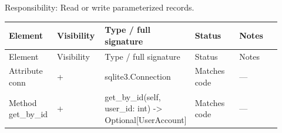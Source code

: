 Responsibility: Read or write parameterized records.

\begin{longtable}{>{\raggedright\arraybackslash}p{0.1840\linewidth}>{\raggedright\arraybackslash}p{0.1840\linewidth}>{\raggedright\arraybackslash}p{0.1840\linewidth}>{\raggedright\arraybackslash}p{0.1840\linewidth}>{\raggedright\arraybackslash}p{0.1840\linewidth}}
Element & Visibility & Type / full signature & Status & Notes \\
\hline\endfirsthead
Element & Visibility & Type / full signature & Status & Notes \\
\hline\endhead
Attribute conn & + & sqlite3.Connection & Matches code & --- \\
Method get\_by\_id & + & get\_by\_id(self, user\_id: int) -\textgreater{} Optional[UserAccount] & Matches code & --- \\
\end{longtable}
